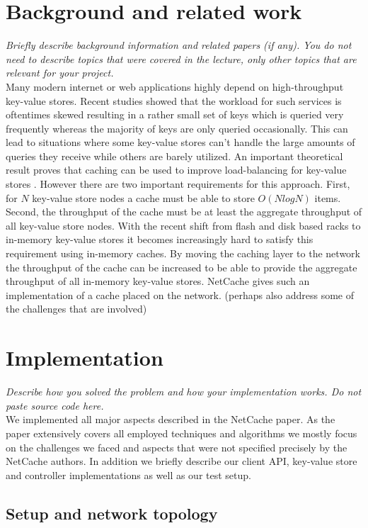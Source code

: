 \documentclass[11pt,oneside,a4paper]{article}
\newcommand{\hint}[1]{{\color{blue} \em #1}}
\begin{document}
\section{Background and related work}
\hint{Briefly describe background information and related papers (if any). You do not need to describe topics that were covered in the lecture, only other topics that are relevant for your project.} \\
Many modern internet or web applications highly depend on high-throughput key-value  stores. 
Recent studies showed that the workload for such services is oftentimes skewed resulting in a rather small set of keys which is queried very frequently whereas the majority of keys are only queried occasionally. 
This can lead to situations where some key-value stores can't handle the large amounts of queries they receive while others are barely utilized.
An important theoretical result proves that caching can be used to improve load-balancing for key-value stores \cite{fan2011small} . 
However there are two important requirements for this approach. 
First, for $N$ key-value store nodes a cache must be able to store $O(N log N)$ items.
Second, the throughput of the cache must be at least the aggregate throughput of all key-value store nodes.
With the recent shift from flash and disk based racks to in-memory key-value stores it becomes increasingly hard to satisfy this requirement using in-memory caches.
By moving the caching layer to the network the throughput of the cache can be increased to be able to provide the aggregate throughput of all in-memory key-value stores.
NetCache gives such an implementation of a cache placed on the network.
(perhaps also address some of the challenges that are involved)

\section{Implementation}
\hint{Describe how you solved the problem and how your implementation works. Do not paste source code here.} \\
We implemented all major aspects described in the  NetCache paper.
As the paper extensively covers all employed techniques and algorithms we mostly focus on the challenges we faced and aspects that were not specified precisely by the NetCache authors.
In addition we briefly describe our client API, key-value store and controller implementations as well as our test setup.

\subsection{Setup and network topology}
\end{document}
